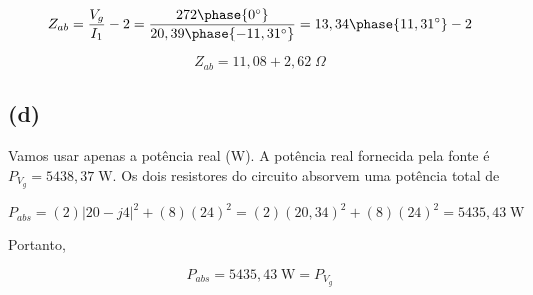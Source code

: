 \[ Z_{ab} = \frac{V_g}{I_1} - 2 = \frac{272\phase{0^{\circ}}}{20,39\phase{-11,31^{\circ}}} = 13,34\phase{11,31^{\circ}} - 2 \]

\[ \boxed{Z_{ab} = 11,08 + 2,62 \;\Omega} \]

\subsection*{(d)}

Vamos usar apenas a potência real (W). A potência real fornecida pela fonte é $P_{V_g} = 5438,37 \;\textrm{W}$. Os dois resistores
do circuito absorvem uma potência total de 

\[ P_{abs} = (2)|20 - j4|^2 + (8)(24)^2 = (2)(20,34)^2 + (8)(24)^2 = 5435,43 \;\textrm{W}  \]

Portanto, 

\[ \boxed{P_{abs} = 5435,43 \;\textrm{W} = P_{V_g}} \]









